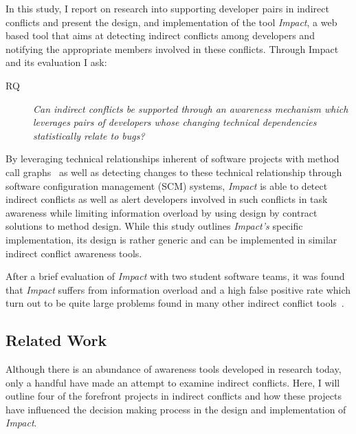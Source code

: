 In this study, I report on research into supporting developer pairs in indirect conflicts
and present the design, and implementation of the tool \textit{Impact},
a web based tool that aims at detecting indirect conflicts among developers
and notifying the appropriate members involved in these conflicts. Through Impact and
its evaluation I ask:

\begin{description}
        \item[RQ] \textit{Can indirect conflicts be supported 
        through an awareness mechanism which leverages pairs of developers whose changing technical 
        dependencies statistically relate to bugs?}
\end{description}

By leveraging technical relationships inherent of 
software projects with method call graphs~\cite{Lakhotia:1993:CCM}
as well as detecting changes
to these technical relationship through software configuration management
(SCM) systems, \textit{Impact} is able to detect indirect conflicts as well as
alert developers involved in such conflicts in task awareness while limiting information
overload by using design by contract~\cite{Meyer:1988} solutions to method design. While this study
outlines \textit{Impact's} specific implementation, its design is rather
generic and can be implemented in similar indirect conflict awareness tools.

After a brief evaluation of \textit{Impact} with two student software teams, it was
found that \textit{Impact} suffers from information overload and a high false positive rate which turn out to be quite
large problems found in many other indirect conflict
tools~\cite{Sarma:2007:TSA, Holmes:2010:CAR, Trainer:2005:BGT, Servant:2010:CPI, Borici:2012:CHA}.

\subsection{Related Work}
Although there is an abundance of awareness tools developed in research
today, only a handful have made an attempt to examine indirect conflicts.
Here, I will outline four of the forefront projects in indirect conflicts
and how these projects have influenced the decision making process in
the design and implementation of \textit{Impact}.

